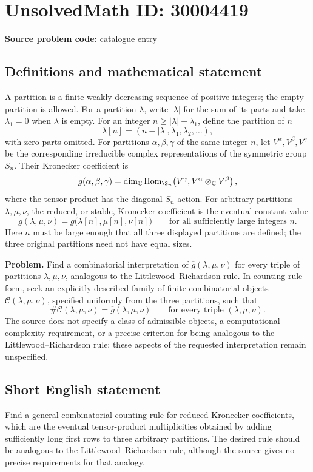 \documentclass[11pt]{article}
\newcommand{\C}{\mathbb{C}}
\begin{document}
\section*{UnsolvedMath ID: 30004419}
\textbf{Source problem code:} catalogue entry
\subsection{Definitions and mathematical statement}
A partition is a finite weakly decreasing sequence of positive integers; the empty partition is allowed. For a partition \(\lambda\), write \(|\lambda|\) for the sum of its parts and take \(\lambda_1=0\) when \(\lambda\) is empty. For an integer \(n\geq |\lambda|+\lambda_1\), define the partition of \(n\)
\[
\lambda[n]=(n-|\lambda|,\lambda_1,\lambda_2,\ldots),
\]
with zero parts omitted. For partitions \(\alpha,\beta,\gamma\) of the same integer \(n\), let \(V^\alpha,V^\beta,V^\gamma\) be the corresponding irreducible complex representations of the symmetric group \(S_n\). Their Kronecker coefficient is
\[
g(\alpha,\beta,\gamma)=\dim_{\C}\operatorname{Hom}_{\S_n}\!\left(V^\gamma,V^\alpha\otimes_{\C}V^\beta\right),
\]
where the tensor product has the diagonal \(S_n\)-action. For arbitrary partitions \(\lambda,\mu,\nu\), the reduced, or stable, Kronecker coefficient is the eventual constant value
\[
\overline g(\lambda,\mu,\nu)=g\bigl(\lambda[n],\mu[n],\nu[n]\bigr)\qquad\text{for all sufficiently large integers }n.
\]
Here \(n\) must be large enough that all three displayed partitions are defined; the three original partitions need not have equal sizes.

\textbf{Problem.} Find a combinatorial interpretation of \(\overline g(\lambda,\mu,\nu)\) for every triple of partitions \(\lambda,\mu,\nu\), analogous to the Littlewood--Richardson rule. In counting-rule form, seek an explicitly described family of finite combinatorial objects \(\mathcal C(\lambda,\mu,\nu)\), specified uniformly from the three partitions, such that
\[
\#\mathcal C(\lambda,\mu,\nu)=\overline g(\lambda,\mu,\nu)
\qquad\text{for every triple }(\lambda,\mu,\nu).
\]
The source does not specify a class of admissible objects, a computational complexity requirement, or a precise criterion for being analogous to the Littlewood--Richardson rule; these aspects of the requested interpretation remain unspecified.
\subsection{Short English statement}
Find a general combinatorial counting rule for reduced Kronecker coefficients, which are the eventual tensor-product multiplicities obtained by adding sufficiently long first rows to three arbitrary partitions. The desired rule should be analogous to the Littlewood--Richardson rule, although the source gives no precise requirements for that analogy.
\end{document}
